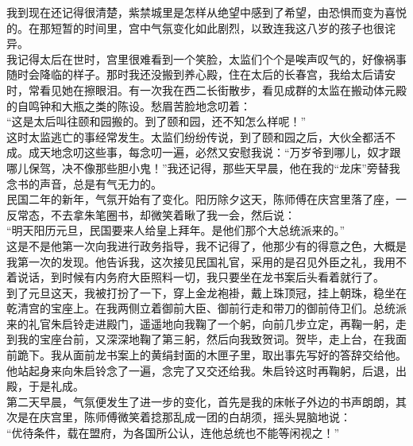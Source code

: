 我到现在还记得很清楚，紫禁城里是怎样从绝望中感到了希望，由恐惧而变为喜悦的。在那短暂的时间里，宫中气氛变化如此剧烈，以致连我这八岁的孩子也很诧异。\\

我记得太后在世时，宫里很难看到一个笑脸，太监们个个是唉声叹气的，好像祸事随时会降临的样子。那时我还没搬到养心殿，住在太后的长春宫，我给太后请安时，常看见她在擦眼泪。有一次我在西二长街散步，看见成群的太监在搬动体元殿的自鸣钟和大瓶之类的陈设。愁眉苦脸地念叨着：\\

“这是太后叫往颐和园搬的。到了颐和园，还不知怎么样呢！”\\

这时太监逃亡的事经常发生。太监们纷纷传说，到了颐和园之后，大伙全都活不成。成天地念叨这些事，每念叨一遍，必然又安慰我说：“万岁爷到哪儿，奴才跟哪儿保驾，决不像那些胆小鬼！”我还记得，那些天早晨，他在我的“龙床”旁替我念书的声音，总是有气无力的。\\

民国二年的新年，气氛开始有了变化。阳历除夕这天，陈师傅在庆宫里落了座，一反常态，不去拿朱笔圈书，却微笑着瞅了我一会，然后说：\\

“明天阳历元旦，民国要来人给皇上拜年。是他们那个大总统派来的。”\\

这是不是他第一次向我进行政务指导，我不记得了，他那少有的得意之色，大概是我第一次的发现。他告诉我，这次接见民国礼官，采用的是召见外臣之礼，我用不着说话，到时候有内务府大臣照料一切，我只要坐在龙书案后头看着就行了。\\

到了元旦这天，我被打扮了一下，穿上金龙袍褂，戴上珠顶冠，挂上朝珠，稳坐在乾清宫的宝座上。在我两侧立着御前大臣、御前行走和带刀的御前侍卫们。总统派来的礼官朱启铃走进殿门，遥遥地向我鞠了一个躬，向前几步立定，再鞠一躬，走到我的宝座台前，又深深地鞠了第三躬，然后向我致贺词。贺毕，走上台，在我面前跪下。我从面前龙书案上的黄绢封面的木匣子里，取出事先写好的答辞交给他。他站起身来向朱启铃念了一遍，念完了又交还给我。朱启铃这时再鞠躬，后退，出殿，于是礼成。\\

第二天早晨，气氛便发生了进一步的变化，首先是我的床帐子外边的书声朗朗，其次是在庆宫里，陈师傅微笑着捻那乱成一团的白胡须，摇头晃脑地说：\\

“优待条件，载在盟府，为各国所公认，连他总统也不能等闲视之！”\\

